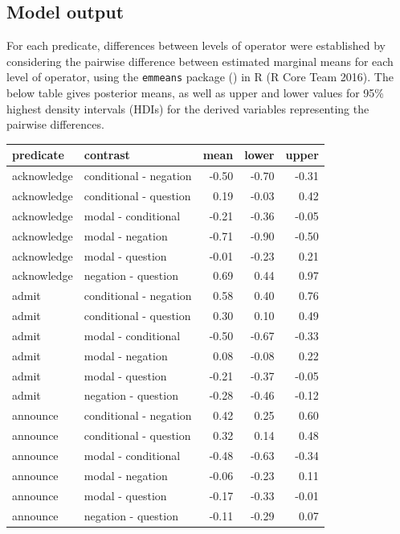 \documentclass[a4paper,12pt,twoside]{article}
\begin{document}
    \subsection{Model output}
        
    For each predicate, differences between levels of operator were established by considering the pairwise difference between estimated marginal means for each level of operator, using the \texttt{emmeans} package (\citealt{lenth_emmeans_2024}) in R (R Core Team 2016). The below table gives posterior means, as well as upper and lower values for 95\% highest density intervals (HDIs) for the derived variables representing the pairwise differences.

    \begin{longtable}{llrrr}\toprule
     predicate & contrast & mean & lower & upper \\ \midrule
     acknowledge & conditional - negation & -0.50 & -0.70 & -0.31 \\ 
      acknowledge & conditional - question & 0.19 & -0.03 & 0.42 \\ 
      acknowledge & modal - conditional & -0.21 & -0.36 & -0.05 \\ 
      acknowledge & modal - negation & -0.71 & -0.90 & -0.50 \\ 
      acknowledge & modal - question & -0.01 & -0.23 & 0.21 \\ 
      acknowledge & negation - question & 0.69 & 0.44 & 0.97 \\ \midrule
      
      admit & conditional - negation & 0.58 & 0.40 & 0.76 \\ 
      admit & conditional - question & 0.30 & 0.10 & 0.49 \\ 
      admit & modal - conditional & -0.50 & -0.67 & -0.33 \\ 
      admit & modal - negation & 0.08 & -0.08 & 0.22 \\ 
      admit & modal - question & -0.21 & -0.37 & -0.05 \\ 
      admit & negation - question & -0.28 & -0.46 & -0.12 \\ \midrule
      
      announce & conditional - negation & 0.42 & 0.25 & 0.60 \\ 
      announce & conditional - question & 0.32 & 0.14 & 0.48 \\ 
      announce & modal - conditional & -0.48 & -0.63 & -0.34 \\ 
      announce & modal - negation & -0.06 & -0.23 & 0.11 \\ 
      announce & modal - question & -0.17 & -0.33 & -0.01 \\ 
      announce & negation - question & -0.11 & -0.29 & 0.07 \\ \midrule
      

\end{longtable}
\end{document}
